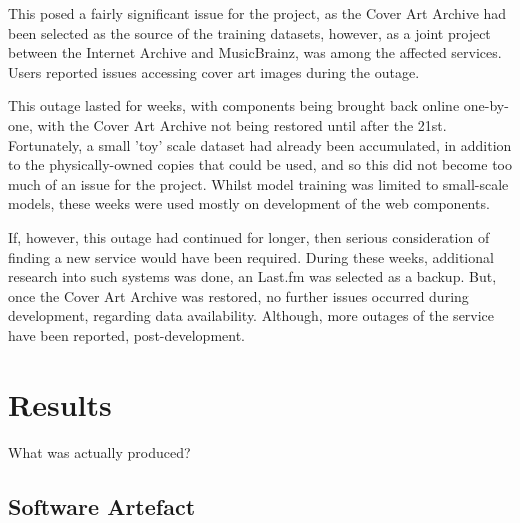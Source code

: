                 This posed a fairly significant issue for the project, as the Cover Art Archive had been selected as the source of the training datasets, however, as a joint project between the Internet Archive and MusicBrainz, was among the affected services. Users reported issues accessing cover art images during the outage. %
    
                This outage lasted for weeks, with components being brought back online one-by-one,
                with the Cover Art Archive not being restored until after the 21st. Fortunately, a small 'toy' scale dataset had already been accumulated, in addition to the physically-owned copies that could be used, and so this did not become too much of an issue for the project. Whilst model training was limited to small-scale models, these weeks were used mostly on development of the web components.
    
                If, however, this outage had continued for longer, then serious consideration of finding a new service would have been required. During these weeks, additional research into such systems was done, an Last.fm was selected as a backup. But, once the Cover Art Archive was restored, no further issues occurred during development, regarding data availability. Although, more outages of the service have been reported, post-development. %
    
    \section{Results} %
        \begin{temp}
            What was actually produced?
        \end{temp}
        \subsection{Software Artefact}
    
